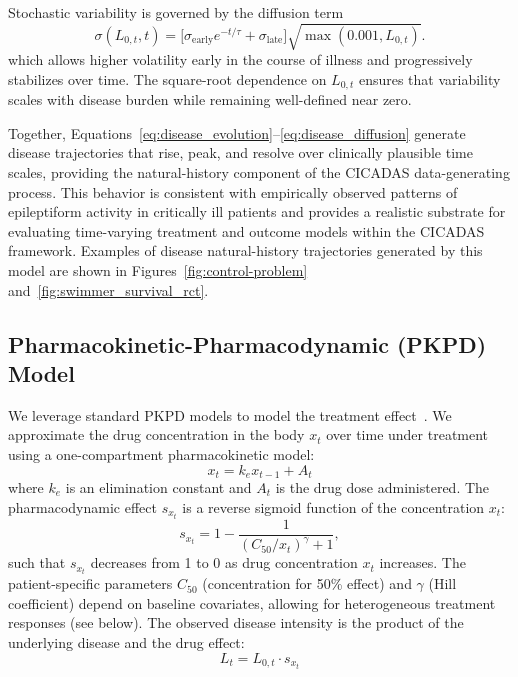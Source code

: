 Stochastic variability is governed by the diffusion term
\begin{equation}
\label{eq:disease_diffusion}
\sigma(L_{0,t}, t)
=
\big[ \sigma_{\mathrm{early}} e^{-t/\tau}
+ \sigma_{\mathrm{late}} \big]
\sqrt{\max(0.001, L_{0,t})}.
\end{equation}
which allows higher volatility early in the course of illness and progressively stabilizes over time. The square-root dependence on $L_{0,t}$ ensures that variability scales with disease burden while remaining well-defined near zero.

Together, Equations~\eqref{eq:disease_evolution}--\eqref{eq:disease_diffusion}
generate disease trajectories that rise, peak, and resolve over clinically
plausible time scales, providing the natural-history component of the
CICADAS data-generating process. This behavior is consistent with empirically observed patterns of epileptiform activity in critically ill patients and provides a realistic substrate for evaluating time-varying treatment and outcome models within the CICADAS framework. Examples of disease natural-history trajectories generated by this model are shown in Figures~\ref{fig:control-problem} and~\ref{fig:swimmer_survival_rct}.

\subsection{Pharmacokinetic-Pharmacodynamic (PKPD) Model}
\label{sec:pkpd_model}
We leverage standard PKPD models to model the treatment effect~\cite{sheiner1979simultaneous,gabrielsson2016pharmacokinetic,hughes1992context}. We approximate the drug concentration in the body $x_t$ over time under treatment using a one-compartment pharmacokinetic model:
\begin{equation}
x_t = k_e x_{t-1} + A_t
\end{equation}
where $k_e$ is an elimination constant and $A_t$ is the drug dose administered. The pharmacodynamic effect $s_{x_t}$ is a reverse sigmoid function of the concentration $x_t$:
\begin{equation}
s_{x_t} = 1 - \frac{1}{(C_{50}/x_t)^\gamma + 1},
\end{equation}
such that $s_{x_t}$ decreases from 1 to 0 as drug concentration $x_t$ increases. The patient-specific parameters $C_{50}$ (concentration for 50\% effect) and $\gamma$ (Hill coefficient) depend on baseline covariates, allowing for heterogeneous treatment responses (see below). The observed disease intensity is the product of the underlying disease and the drug effect:
\begin{equation}
L_t = L_{0,t} \cdot s_{x_t}
\end{equation}

